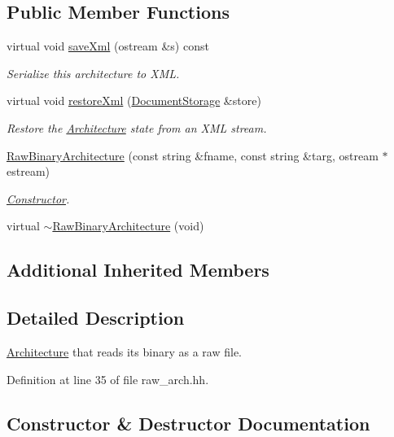 \subsection*{Public Member Functions}
\begin{DoxyCompactItemize}
\item 
virtual void \mbox{\hyperlink{class_raw_binary_architecture_a3aafb658662f5d6af564e22f5b35aafc}{save\+Xml}} (ostream \&s) const
\begin{DoxyCompactList}\small\item\em Serialize this architecture to X\+ML. \end{DoxyCompactList}\item 
virtual void \mbox{\hyperlink{class_raw_binary_architecture_a381c8c1c048d0c8a17322ef8a17ae6ea}{restore\+Xml}} (\mbox{\hyperlink{class_document_storage}{Document\+Storage}} \&store)
\begin{DoxyCompactList}\small\item\em Restore the \mbox{\hyperlink{class_architecture}{Architecture}} state from an X\+ML stream. \end{DoxyCompactList}\item 
\mbox{\hyperlink{class_raw_binary_architecture_a790334042332785367ebaf46886da65f}{Raw\+Binary\+Architecture}} (const string \&fname, const string \&targ, ostream $\ast$estream)
\begin{DoxyCompactList}\small\item\em \mbox{\hyperlink{class_constructor}{Constructor}}. \end{DoxyCompactList}\item 
virtual \mbox{\hyperlink{class_raw_binary_architecture_a09070e33ef9932cf5b53de7e683e8fb2}{$\sim$\+Raw\+Binary\+Architecture}} (void)
\end{DoxyCompactItemize}
\subsection*{Additional Inherited Members}


\subsection{Detailed Description}
\mbox{\hyperlink{class_architecture}{Architecture}} that reads its binary as a raw file. 

Definition at line 35 of file raw\+\_\+arch.\+hh.



\subsection{Constructor \& Destructor Documentation}
\mbox{\label{class_raw_binary_architecture_a790334042332785367ebaf46886da65f}} 
